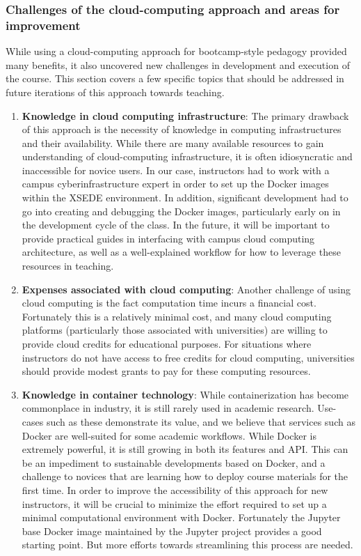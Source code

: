 \subsubsection{Challenges of the cloud-computing approach and areas for improvement}

While using a cloud-computing approach for bootcamp-style pedagogy provided many
benefits, it also uncovered new challenges in development and execution of the
course. This section covers a few specific topics that should be addressed in
future iterations of this approach towards teaching.

\begin{enumerate}

\item {\bf Knowledge in cloud computing infrastructure}: The primary drawback of
this approach is the necessity of knowledge in computing infrastructures and
their availability. While there are many available resources to gain
understanding of cloud-computing infrastructure, it is often idiosyncratic and
inaccessible for novice users. In our case, instructors had to work with a
campus cyberinfrastructure expert in order to set up the Docker images within
the XSEDE environment. In addition, significant development had to go into
creating and debugging the Docker images, particularly early on in the
development cycle of the class. In the future, it will be important to provide
practical guides in interfacing with campus cloud computing architecture, as
well as a well-explained workflow for how to leverage these resources in
teaching.

\item {\bf Expenses associated with cloud computing}: Another challenge of using
cloud computing is the fact computation time incurs a financial cost.
Fortunately this is a relatively minimal cost, and many cloud computing
platforms (particularly those associated with universities) are willing to
provide cloud credits for educational purposes. For situations where instructors
do not have access to free credits for cloud computing, universities should
provide modest grants to pay for these computing resources.

\item {\bf Knowledge in container technology}: While containerization has become
commonplace in industry, it is still rarely used in academic research. Use-cases
such as these demonstrate its value, and we believe that services such as Docker
are well-suited for some academic workflows. While Docker is extremely powerful,
it is still growing in both its features and API. This can be an impediment to
sustainable developments based on Docker, and a challenge to novices that are
learning how to deploy course materials for the first time. In order to improve
the accessibility of this approach for new instructors, it will be crucial to
minimize the effort required to set up a minimal computational environment with
Docker. Fortunately the Jupyter base Docker image maintained by the Jupyter
project provides a good starting point. But more efforts towards streamlining
this process are needed.


\end{enumerate}
